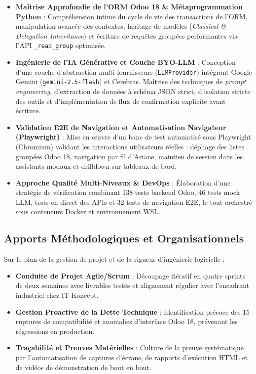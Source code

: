 \begin{itemize}[leftmargin=1.5cm, label=\textcolor{odooPurple}{\small\textbullet}]
    \item \textbf{Maîtrise Approfondie de l'ORM Odoo 18 \& Métaprogrammation Python} : Compréhension intime du cycle de vie des transactions de l'ORM, manipulation avancée des contextes, héritage de modèles (\textit{Classical \& Delegation Inheritance}) et écriture de requêtes groupées performantes via l'API \texttt{\_read\_group} optimisée.
    \item \textbf{Ingénierie de l'IA Générative et Couche BYO-LLM} : Conception d'une couche d'abstraction multi-fournisseurs (\texttt{LLMProvider}) intégrant Google Gemini (\texttt{gemini-2.5-flash}) et Cerebras. Maîtrise des techniques de \textit{prompt engineering}, d'extraction de données à schéma JSON strict, d'isolation stricte des outils et d'implémentation de flux de confirmation explicite avant écriture.
    \item \textbf{Validation E2E de Navigation et Automatisation Navigateur (Playwright)} : Mise en œuvre d'un banc de test automatisé sous Playwright (Chromium) validant les interactions utilisateurs réelles : dépliage des listes groupées Odoo 18, navigation par fil d'Ariane, maintien de session dans les assistants modaux et drilldown sur tableaux de bord.
    \item \textbf{Approche Qualité Multi-Niveaux \& DevOps} : Élaboration d'une stratégie de vérification combinant 138 tests backend Odoo, 46 tests mock LLM, tests en direct des APIs et 32 tests de navigation E2E, le tout orchestré sous conteneurs Docker et environnement WSL.
\end{itemize}

\subsection{Apports Méthodologiques et Organisationnels}
Sur le plan de la gestion de projet et de la rigueur d'ingénierie logicielle :
\begin{itemize}[leftmargin=1.5cm, label=\textcolor{odooPurple}{\small\textbullet}]
    \item \textbf{Conduite de Projet Agile/Scrum} : Découpage itératif en quatre sprints de deux semaines avec livrables testés et alignement régulier avec l'encadrant industriel chez IT-Koncept.
    \item \textbf{Gestion Proactive de la Dette Technique} : Identification précoce des 15 ruptures de compatibilité et anomalies d'interface Odoo 18, prévenant les régressions en production.
    \item \textbf{Traçabilité et Preuves Matérielles} : Culture de la preuve systématique par l'automatisation de captures d'écrans, de rapports d'exécution HTML et de vidéos de démonstration de bout en bout.
\end{itemize}

